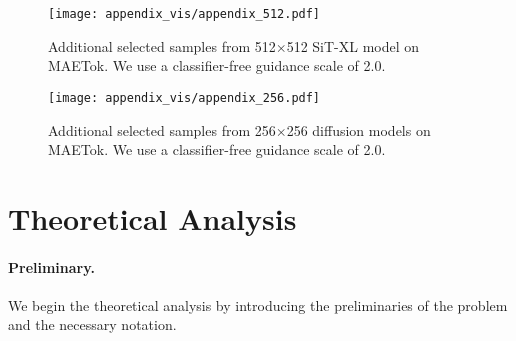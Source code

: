 \appendix
\onecolumn

\begin{figure}[t]
    \centering
    \texttt{[image: appendix\_vis/appendix\_512.pdf]}
    \caption{Additional selected samples from 512$\times$512 SiT-XL model on MAETok. We use a classifier-free guidance scale of 2.0.}
    \label{fig:appendix_more_512}
\end{figure}

\begin{figure}[t]
    \centering
    \texttt{[image: appendix\_vis/appendix\_256.pdf]}
    \caption{Additional selected samples from 256$\times$256 diffusion models on MAETok. We use a classifier-free guidance scale of 2.0.}
    \label{fig:appendix_more_256}
\end{figure}

\section{Theoretical Analysis}
\label{app:theory-analysis}
\paragraph{Preliminary.}We begin the theoretical analysis by introducing the preliminaries of the problem and the necessary notation.

